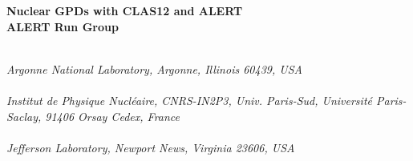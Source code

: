 \begin{titlepage}
     \begin{center}
       \vspace*{-1.5cm}
        \\
       \vspace*{0.2cm}
        \\
       \vspace*{2.3cm}
       \noindent \Huge \textbf{Nuclear GPDs with CLAS12 and ALERT} \\
       \vspace*{0.6cm}
       \noindent \Large \textbf{ALERT Run Group} \\
       \vspace*{0.7cm}
     \end{center}
   
     \begin{center}
       \vspace*{1.0cm}
        \\
       \vspace*{0.2cm}
       \noindent \emph{Argonne National Laboratory, Argonne, Illinois 60439, USA} \\
       \vspace*{0.7cm}
        \\
       \vspace*{0.2cm}
       \noindent \emph{Institut de Physique Nucl\'eaire, CNRS-IN2P3, Univ. Paris-Sud, Universit\'e Paris-Saclay, 91406 Orsay Cedex, France} \\
       \vspace*{0.7cm}
        \\
       \vspace*{0.2cm}
       \noindent \emph{Jefferson Laboratory, Newport News, Virginia 23606, USA} \\
       \vspace*{0.7cm}
       \noindent {} \\
       \vspace*{0.2cm}
       \noindent \emph{} \\
       \vspace*{0.7cm}
     \end{center}

\date{\today}
     

\end{titlepage}
\sloppy

\titlepage
